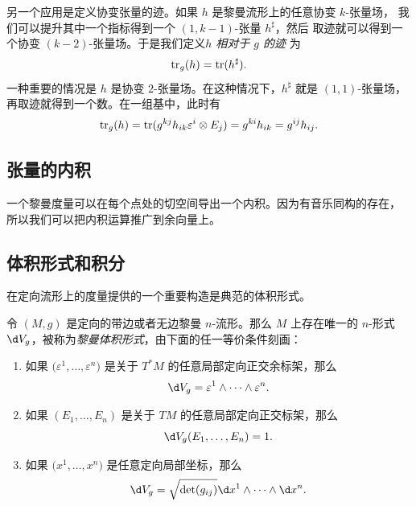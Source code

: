 另一个应用是定义协变张量的迹。如果 $h$ 是黎曼流形上的任意协变 $k$-张量场，
我们可以提升其中一个指标得到一个 $(1,k-1)$-张量 $h^\sharp$，然后
取迹就可以得到一个协变 $(k-2)$-张量场。于是我们定义\emph{$h$ 相对于 $g$ 的迹}
为
\[
  \operatorname{tr}_g(h)=\operatorname{tr}(h^\sharp).
\]
一种重要的情况是 $h$ 是协变 $2$-张量场。在这种情况下，$h^\sharp$ 就是 $(1,1)$-张量场，
再取迹就得到一个数。在一组基中，此时有
\[
  \operatorname{tr}_g(h)=\operatorname{tr} (g^{kj}h_{ik}\varepsilon^i\otimes E_j)=g^{ki}h_{ik}=g^{ij}h_{ij}.
\]

\subsection{张量的内积}

一个黎曼度量可以在每个点处的切空间导出一个内积。因为有音乐同构的存在，
所以我们可以把内积运算推广到余向量上。



\subsection{体积形式和积分}

在定向流形上的度量提供的一个重要构造是典范的体积形式。

\begin{proposition}[黎曼体积形式]
  令 $(M,g)$ 是定向的带边或者无边黎曼 $n$-流形。那么 $M$ 上存在唯一的 $n$-形式
  $\d V_g$，被称为\emph{黎曼体积形式}，由下面的任一等价条件刻画：
  \begin{enumerate}
    \item 如果 $\bigl(\varepsilon^1,\dots,\varepsilon^n\bigr)$ 是关于 $T^*M$
    的任意局部定向正交余标架，那么
    \[
      \d V_g=\varepsilon^1\wedge\cdots\wedge \varepsilon^n.
    \]
    \item 如果 $(E_1,\dots,E_n)$ 是关于 $TM$ 的任意局部定向正交标架，那么
    \[
      \d V_g(E_1,\dots,E_n)=1.
    \]
    \item 如果 $\bigl(x^1,\dots,x^n\bigr)$ 是任意定向局部坐标，那么
    \[
      \d V_g=\sqrt{\det(g_{ij})}\d x^1\wedge\cdots\wedge \d x^n.
    \]
  \end{enumerate}
\end{proposition}











